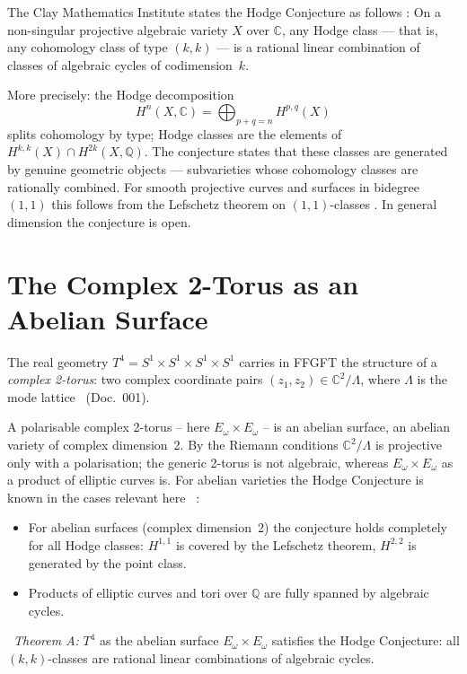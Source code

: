 The Clay Mathematics Institute states the Hodge Conjecture as follows \QM:
On a non-singular projective algebraic variety $X$ over $\mathbb{C}$, any
Hodge class — that is, any cohomology class of type $(k,k)$ — is a rational
linear combination of classes of algebraic cycles of codimension~$k$.

More precisely: the Hodge decomposition
\[
H^n(X,\mathbb{C}) = \bigoplus_{p+q=n} H^{p,q}(X)
\]
splits cohomology by type; Hodge classes are the elements of
$H^{k,k}(X) \cap H^{2k}(X,\mathbb{Q})$. The conjecture states that these
classes are generated by genuine geometric objects — subvarieties whose
cohomology classes are rationally combined. For smooth projective curves
and surfaces in bidegree $(1,1)$ this follows from the Lefschetz theorem on
$(1,1)$-classes \EM. In general dimension the conjecture is open.

\section{The Complex 2-Torus as an Abelian Surface}

The real geometry $T^4 = S^1 \times S^1 \times S^1 \times S^1$ carries in
FFGFT the structure of a \emph{complex 2-torus}: two complex coordinate pairs
$(z_1,z_2) \in \mathbb{C}^2/\Lambda$, where $\Lambda$ is the mode lattice
\SetzM\ (Doc.~001).

A polarisable complex 2-torus -- here $E_\omega\times E_\omega$ -- is an
abelian surface, an abelian variety of complex dimension~2.
By the Riemann conditions $\mathbb{C}^2/\Lambda$ is projective only with a
polarisation; the generic 2-torus is not algebraic, whereas
$E_\omega\times E_\omega$ as a product of elliptic curves is. For abelian varieties the Hodge Conjecture is known in the cases
relevant here \EM\ \QM:
\begin{itemize}
\item For abelian surfaces (complex dimension~2) the conjecture holds completely
      for all Hodge classes: $H^{1,1}$ is covered by the Lefschetz theorem,
      $H^{2,2}$ is generated by the point class.
\item Products of elliptic curves and tori over $\mathbb{Q}$ are fully spanned
      by algebraic cycles.
\end{itemize}

\noindent \BM\ \textit{Theorem A:} $T^4$ as the abelian surface
$E_\omega\times E_\omega$ satisfies the
Hodge Conjecture: all $(k,k)$-classes are rational linear combinations of
algebraic cycles.

